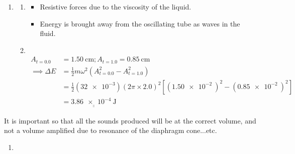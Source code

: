 \documentclass[11pt]{article}
\def\doubleunderline#1{\underline{\underline{#1}}}
\begin{document}
\begin{enumerate}[label={[D\arabic*]},itemsep={1em}]
\begin{enumerate}
\begin{enumerate}[label={(\roman*)}]
\begin{enumerate}[label={\arabic*.}]
									\textit{\small Note; When reading off graphs, you can be precise up to half of the smallest square. e.g. the precision of the given graph $= 0.25/20 = 0.0125 \implies$ up to 4 decimal places, but the last decimal place is either 5 or 0.}
								\item \textcolor{white}{.}
									\vspace{-\baselineskip}
									\begin{equation*}
										\omega^2 = \left(2\pi\!f\right)^2 = \frac{\rho Ag}{m} \implies \rho = \frac{m\left(2\pi\!f\right)^2}{Ag} = \doubleunderline{\SI{1.2e3}{\kilogram\per\meter\cubed}}
									\end{equation*}
							\end{enumerate}
						\item 
						\begin{enumerate}[label={\arabic*.}]
							\item 
								\begin{itemize}
									\item Resistive forces due to the viscosity of the liquid. 
									\item Energy is brought away from the oscillating tube as waves in the fluid.
								\end{itemize}
							\item \textcolor{white}{.}
								\vspace{-1.5\baselineskip}
								\begin{align*}
									A_{t = 0.0} &= \SI{1.50}{\centi\meter}; A_{t = 1.0} = \SI{0.85}{\centi\meter} \\
									\implies \Delta E &= \frac{1}{2}m\omega^2\left(A_{t = 0.0}^2 - A_{t = 1.0}^2\right) \\
									&= \frac{1}{2}\left(\num{32e-3}\right)\left(2\pi\times 2.0\right)^2\left[\left(\SI{1.50e-2}{}\right)^2-\left(\SI{0.85e-2}{}\right)^2\right] \\
									&= \doubleunderline{\SI{3.86e-4}{\joule}}
								\end{align*}
						\end{enumerate}
					\end{enumerate}
			\end{enumerate}
		\item It is important so that all the sounds produced will be at the correct volume, and not a volume amplified due to resonance of the diaphragm cone...etc.
		\item 
			\begin{enumerate}
				\item 

\end{enumerate}
\end{enumerate}
\end{document}
